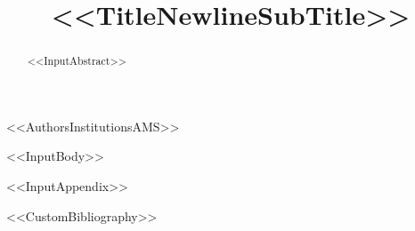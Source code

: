 \documentclass[<<DocumentClassOptions>>]{mcom-l}
\begin{document}
\title[<<ShortTitle>>]{<<TitleNewlineSubTitle>>}

<<AuthorsInstitutionsAMS>>
\gdef\shortauthors{<<AuthorsRunningHeadAMS>>}


\date{}


\begin{abstract}
<<InputAbstract>>
\end{abstract}

\maketitle

<<InputBody>>

\appendix
<<InputAppendix>>


<<CustomBibliography>>
\end{document}

